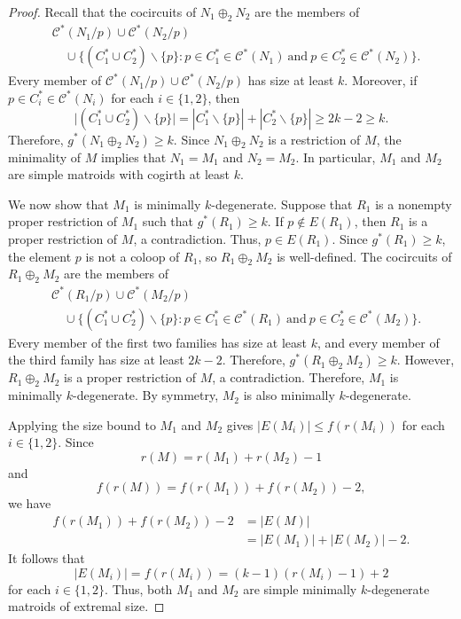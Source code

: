 \documentclass{amsart}
\newcommand{\cC}{\mathcal{C}}
\theoremstyle{definition}
\theoremstyle{remark}
\numberwithin{equation}{section}
\begin{document}
\begin{proof}
Recall that the cocircuits of $N_1\oplus_2 N_2$ are the members of
\begin{align*}
    &\cC^*(N_1/p)\cup\cC^*(N_2/p)\\
    &\quad\cup\bigl\{(C_1^*\cup C_2^*)\backslash\{p\}:
    p\in C_1^*\in\cC^*(N_1)\ \text{and}\
    p\in C_2^*\in\cC^*(N_2)\bigr\}.
\end{align*}
Every member of $\cC^*(N_1/p)\cup\cC^*(N_2/p)$ has size at least $k$. Moreover, if $p\in C_i^*\in\cC^*(N_i)$ for each $i\in\{1,2\}$, then
\[
    \bigl|(C_1^*\cup C_2^*)\backslash\{p\}\bigr|
    =|C_1^*\backslash\{p\}|+|C_2^*\backslash\{p\}|
    \geq 2k-2\geq k.
\]
Therefore, $g^*(N_1\oplus_2 N_2)\geq k$. Since $N_1\oplus_2 N_2$ is a restriction of $M$, the minimality of $M$ implies that $N_1=M_1$ and $N_2=M_2$. In particular, $M_1$ and $M_2$ are simple matroids with cogirth at least $k$.

We now show that $M_1$ is minimally $k$-degenerate. Suppose that $R_1$ is a nonempty proper restriction of $M_1$ such that $g^*(R_1)\geq k$. If $p\notin E(R_1)$, then $R_1$ is a proper restriction of $M$, a contradiction. Thus, $p\in E(R_1)$. Since $g^*(R_1)\geq k$, the element $p$ is not a coloop of $R_1$, so $R_1\oplus_2 M_2$ is well-defined. The cocircuits of $R_1\oplus_2 M_2$ are the members of
\begin{align*}
    &\cC^*(R_1/p)\cup\cC^*(M_2/p)\\
    &\quad\cup\bigl\{(C_1^*\cup C_2^*)\backslash\{p\}:
    p\in C_1^*\in\cC^*(R_1)\ \text{and}\
    p\in C_2^*\in\cC^*(M_2)\bigr\}.
\end{align*}
Every member of the first two families has size at least $k$, and every member of the third family has size at least $2k-2$. Therefore, $g^*(R_1\oplus_2 M_2)\geq k$. However, $R_1\oplus_2 M_2$ is a proper restriction of $M$, a contradiction. Therefore, $M_1$ is minimally $k$-degenerate. By symmetry, $M_2$ is also minimally $k$-degenerate.

Applying the size bound to $M_1$ and $M_2$ gives $|E(M_i)|\leq f(r(M_i))$ for each $i\in\{1,2\}$. Since
\[
    r(M)=r(M_1)+r(M_2)-1
\]
and
\[
    f(r(M))=f(r(M_1))+f(r(M_2))-2,
\]
we have
\begin{align*}
    f(r(M_1))+f(r(M_2))-2
    &=|E(M)|\\
    &=|E(M_1)|+|E(M_2)|-2.
\end{align*}
It follows that
\[
    |E(M_i)|=f(r(M_i))=(k-1)(r(M_i)-1)+2
\]
for each $i\in\{1,2\}$. Thus, both $M_1$ and $M_2$ are simple minimally $k$-degenerate matroids of extremal size.
\end{proof}
\end{document}
